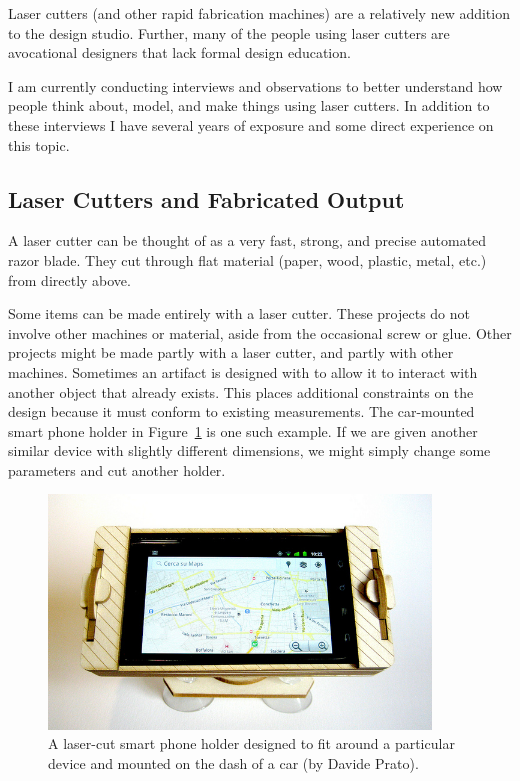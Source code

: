 \documentclass[11pt]{article}
\begin{document}
Laser cutters (and other rapid fabrication machines) are a relatively
new addition to the design studio. Further, many of the people using
laser cutters are avocational designers that lack formal design
education.

I am currently conducting interviews and observations to better
understand how people think about, model, and make things using laser
cutters. In addition to these interviews I have several years of
exposure and some direct experience on this topic.

\subsection{Laser Cutters and Fabricated Output}

A laser cutter can be thought of as a very fast, strong, and precise
automated razor blade. They cut through flat material (paper, wood,
plastic, metal, etc.) from directly above.

Some items can be made entirely with a laser cutter. These projects do
not involve other machines or material, aside from the occasional
screw or glue. Other projects might be made partly with a laser
cutter, and partly with other machines. Sometimes an artifact is
designed with to allow it to interact with another object that already
exists. This places additional constraints on the design because it
must conform to existing measurements. The car-mounted smart phone
holder in Figure~\ref{fig:phone-holder} is one such example. If we are
given another similar device with slightly different dimensions, we
might simply change some parameters and cut another holder.

\begin{figure}[h] %
   \centering
   \includegraphics[width=4in]{img/phone-holder.jpg} 
   \caption{A laser-cut smart phone holder designed to fit around a
     particular device and mounted on the dash of a car (by Davide
     Prato).}
   \label{fig:phone-holder}
\end{figure}
\end{document}
